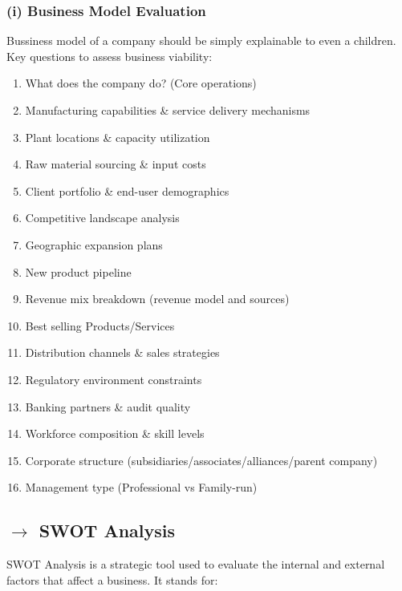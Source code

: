 \documentclass[12pt]{article}
\begin{document}
\subsubsection*{(i) Business Model Evaluation}
Bussiness model of a company should be simply explainable to even a children. Key questions to assess business viability:
\begin{enumerate}
\item What does the company do? (Core operations)
\item Manufacturing capabilities \& service delivery mechanisms
\item Plant locations \& capacity utilization
\item Raw material sourcing \& input costs
\item Client portfolio \& end-user demographics
\item Competitive landscape analysis
\item Geographic expansion plans
\item New product pipeline
\item Revenue mix breakdown (revenue model and sources)
\item Best selling Products/Services
\item Distribution channels \& sales strategies
\item Regulatory environment constraints
\item Banking partners \& audit quality
\item Workforce composition \& skill levels
\item Corporate structure (subsidiaries/associates/alliances/parent company)
\item Management type (Professional vs Family-run)
\end{enumerate}

\subsection*{$\rightarrow$ SWOT Analysis}

SWOT Analysis is a strategic tool used to evaluate the internal and external factors that affect a business. It stands for:
\end{document}
